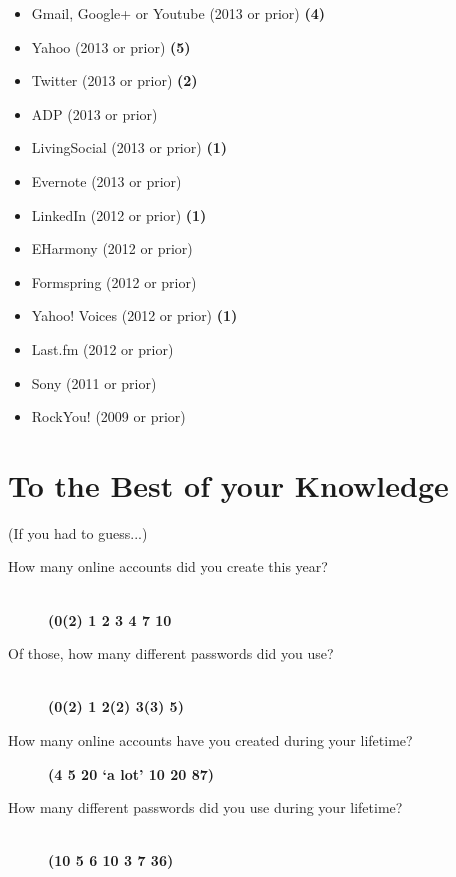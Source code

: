 \documentclass{article}
\begin{document}
\begin{description}
\begin{itemize}
          \item Gmail, Google+ or Youtube (2013 or prior) \textbf{(4)}
          \item Yahoo (2013 or prior) \textbf{(5)}
          \item Twitter (2013 or prior) \textbf{(2)}
          \item ADP (2013 or prior)
          \item LivingSocial (2013 or prior) \textbf{(1)}
          \item Evernote (2013 or prior)
          \item LinkedIn (2012 or prior) \textbf{(1)}
          \item EHarmony (2012 or prior)
          \item Formspring (2012 or prior)
          \item Yahoo! Voices (2012 or prior) \textbf{(1)}
          \item Last.fm (2012 or prior)
          \item Sony (2011 or prior)
          \item RockYou! (2009 or prior)
        \end{itemize}
    \end{description}
  \section{To the Best of your Knowledge}
    {\small (If you had to guess...)}
  \begin{description}
    \item[How many online accounts did you create this year?] \mbox{}\\  \textbf{(0(2) 1 2 3 4 7 10}
    \item[Of those, how many different passwords did you use?] \mbox{}\\  \textbf{(0(2) 1 2(2) 3(3) 5)}
    \item[How many online accounts have you created during your lifetime?]  \textbf{(4 5 20 `a lot' 10 20 87)}
    \item[How many different passwords did you use during your lifetime?] \mbox{}\\  \textbf{(10 5 6 10 3 7 36)}
  \end{description}
\end{document}
